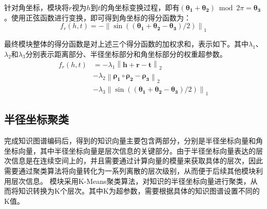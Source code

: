 \documentclass[algorithmlist, AutoFakeBold, AutoFakeSlant, figurelist, tablelist, nomlist, masters]{seuthesix}
\begin{document}
针对角坐标，模块将$r$视为$h$到$t$的角坐标变换过程，即有$(\bm{\theta_1} + \bm{\theta_2}) \bmod 2 \pi = \bm{\theta_3}$。使用正弦函数进行变换，即可得到角坐标的得分函数为：
\begin{equation}
  f_r\left(h, t\right) =-\left\|\sin \left(\left(\bm{\theta_1}+\bm{\theta_2}-\bm{\theta_3}\right) / 2\right)\right\|_1
\end{equation}

最终模块整体的得分函数是对上述三个得分函数的加权求和，表示如下。其中$\lambda_1$、$\lambda_2$和$\lambda_3$分别表示距离部分、半径坐标部分和角坐标部分的权重超参数。
\begin{equation}
  \begin{aligned}
    f_r\left(h, t\right) &=-\lambda_1 \left\|\bm{h} + \bm{r} - \bm{t}\right\|_2 \\
    &-\lambda_2 \left\|\bm{\rho_1} \circ \bm{\rho_2} - \bm{\rho_3}\right\|_2 \\
    &-\lambda_3\left\|\sin \left(\left(\bm{\theta_1}+\bm{\theta_2}-\bm{\theta_3}\right) / 2\right)\right\|_1
  \end{aligned}
\end{equation}


\subsection{半径坐标聚类}
完成知识图谱编码后，得到的知识向量主要包含两部分，分别是半径坐标向量和角坐标向量，其中半径坐标向量是层次信息的关键部分。由于半径坐标向量表达的层次信息是在连续空间上的，并且需要通过计算向量的模量来获取具体的层次，因此需要通过聚类算法将向量转化为一系列离散的层次级别，从而便于后续其他模块利用层次信息。
模块采用K-Means聚类算法，对知识的半径坐标向量进行聚类，从而将知识转换为K个层次。其中K为超参数，需要根据具体的知识图谱设置不同的K值。
\end{document}
